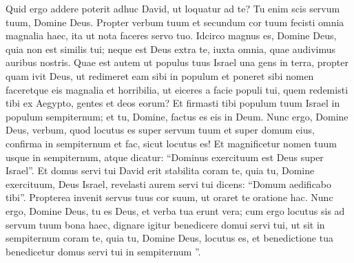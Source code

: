 \begin{biblechapter}
\begin{biblechapter}
\begin{biblechapter}
\begin{biblechapter}
\begin{biblechapter}
\begin{biblechapter}
\begin{biblechapter}
\verse Quid ergo addere poterit adhuc David, ut loquatur ad te? Tu enim scis servum tuum, Domine Deus. 
\verse Propter verbum tuum et secundum cor tuum fecisti omnia magnalia haec, ita ut nota faceres servo tuo. 
\verse Idcirco magnus es, Domine Deus, quia non est similis tui; neque est Deus extra te, iuxta omnia, quae audivimus auribus nostris. 
\verse Quae est autem ut populus tuus Israel una gens in terra, propter quam ivit Deus, ut redimeret eam sibi in populum et poneret sibi nomen faceretque eis magnalia et horribilia, ut eiceres a facie populi tui, quem redemisti tibi ex Aegypto, gentes et deos eorum? 
\verse Et firmasti tibi populum tuum Israel in populum sempiternum; et tu, Domine, factus es eis in Deum. 
\verse Nunc ergo, Domine Deus, verbum, quod locutus es super servum tuum et super domum eius, confirma in sempiternum et fac, sicut locutus es! 
\verse Et magnificetur nomen tuum usque in sempiternum, atque dicatur: “Dominus exercituum est Deus super Israel”. Et domus servi tui David erit stabilita coram te, 
\verse quia tu, Domine exercituum, Deus Israel, revelasti aurem servi tui dicens: “Domum aedificabo tibi”. Propterea invenit servus tuus cor suum, ut oraret te oratione hac. 
\verse Nunc ergo, Domine Deus, tu es Deus, et verba tua erunt vera; cum ergo locutus sis ad servum tuum bona haec, 
\verse dignare igitur benedicere domui servi tui, ut sit in sempiternum coram te, quia tu, Domine Deus, locutus es, et benedictione tua benedicetur domus servi tui in sempiternum ”.
 

\end{biblechapter}
\end{biblechapter}
\end{biblechapter}
\end{biblechapter}
\end{biblechapter}
\end{biblechapter}
\end{biblechapter}
